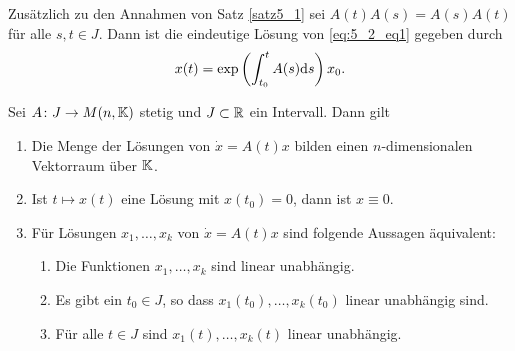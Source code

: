\begin{kor}\label{kor5_2}
	Zusätzlich zu den Annahmen von Satz \ref{satz5_1} sei $A(t)A(s) = A(s)A(t)$ für alle $s,t \in J$. Dann ist die eindeutige Lösung von \eqref{eq:5_2_eq1} gegeben durch
	\[x(t) = \exp\left(\int_{t_0}^{t} A(s) \mathrm{d} s\right)x_0.\]
\end{kor}
\begin{satz}\label{satz5_3}
	Sei $A \colon J \to M(n, \mathbb{K})$ stetig und $J \subset \mathbb{R}$ ein Intervall. Dann gilt
	\begin{enumerate}[label=(\alph*)]
		\item Die Menge der Lösungen von $\dot{x} = A(t)x$ bilden einen $n$-dimensionalen Vektorraum über $\mathbb{K}$.
		\item Ist $t \mapsto x(t)$ eine Lösung mit $x(t_0) = 0$, dann ist $x \equiv 0$.
		\item Für Lösungen $x_1, \dots, x_k$ von $\dot{x}= A(t)x$ sind folgende Aussagen äquivalent:
		\begin{enumerate}[label=(\roman*)]
			\item Die Funktionen $x_1, \dots, x_k$ sind linear unabhängig.
			\item Es gibt ein $t_0 \in J$, so dass $x_1(t_0), \dots, x_k(t_0)$ linear unabhängig sind.
			\item Für alle $t \in J$ sind $x_1(t), \dots, x_k(t)$ linear unabhängig.
		\end{enumerate}
	\end{enumerate}
\end{satz}

